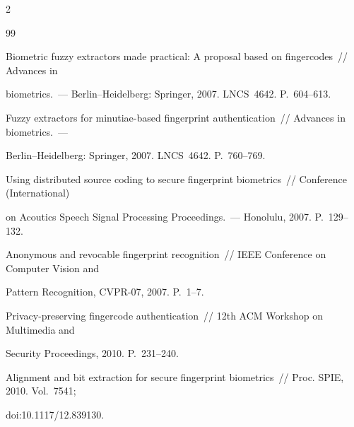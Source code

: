 \begin{multicols}{2}
{{\begin{thebibliography}{99}


Biometric fuzzy extractors made practical: A proposal based on fingercodes~// Advances in 

biometrics.~--- Berlin--Heidelberg: Springer, 2007. LNCS~4642. P.~604--613.





Fuzzy extractors for minutiae-based fingerprint authentication~// Advances in biometrics.~--- 

Berlin--Heidelberg: Springer, 2007. LNCS~4642. P.~760--769.





Using distributed source coding to secure fingerprint biometrics~//  Conference (International)

on  Acoutics Speech Signal Processing Proceedings.~--- Honolulu, 2007. P.~129--132.





Anonymous and revocable fingerprint recognition~// IEEE Conference on Computer Vision and 

Pattern Recognition, CVPR-07, 2007. P.~1--7. 





Privacy-preserving fingercode authentication~// 12th ACM Workshop on Multimedia and 

Security Proceedings, 2010. P.~231--240.





Alignment and bit extraction for secure fingerprint biometrics~// Proc. SPIE, 2010. Vol.~7541; 

doi:10.1117/12.839130. 






\end{thebibliography}}}
\end{multicols}
